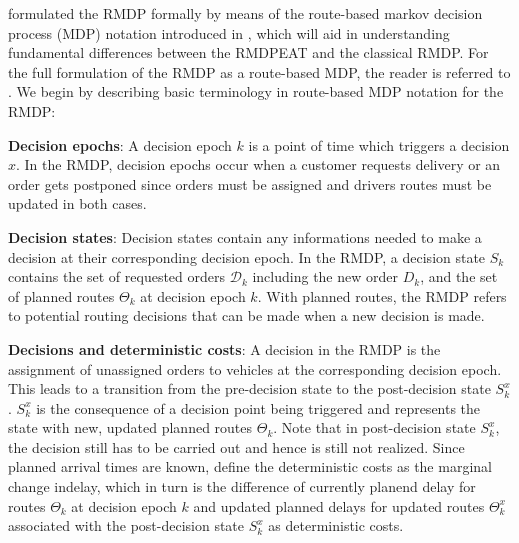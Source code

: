\cite{UlmerRMDP} formulated the RMDP formally by means of the route-based markov decision process (MDP) notation introduced in \cite{ulmer2017route}, which will aid in understanding fundamental differences between the RMDPEAT and the classical RMDP. For the full formulation of the RMDP as a route-based MDP, the reader is referred to \cite{UlmerBarrett2017_TWAP}. We begin by describing basic terminology in route-based MDP notation for the RMDP:
\begin{description}[font=$\bullet$\scshape\bfseries]
	\item \textbf{Decision epochs}: A decision epoch $ k $ is a point of time which triggers a decision $ x $. In the RMDP, decision epochs occur when a customer requests delivery or an order gets postponed since orders must be assigned and drivers routes must be updated in both cases.
	
	\item \textbf{Decision states}: Decision states contain any informations needed to make a decision at their corresponding decision epoch. In the RMDP, a decision state $ S_k $ contains the set of requested orders $ \mathcal{D}_k $ including the new order $ D_k $, and the set of planned routes $ \Theta_k $ at decision epoch $ k $. With planned routes, the RMDP refers to potential routing decisions that can be made when a new decision is made. 
	
	\item \textbf{Decisions and deterministic costs}: A decision in the RMDP is the assignment of unassigned orders to vehicles at the corresponding decision epoch. This leads to a transition from the pre-decision state to the post-decision state $ S^{x}_k $. $ S^{x}_k $ is the consequence of a decision point being triggered and represents the state with new, updated planned routes $ \Theta_k $. Note that in post-decision state $ S^{x}_k $, the decision still has to be carried out and hence is still not realized. Since planned arrival times are known, \cite{UlmerBarrett2017_TWAP} define the deterministic costs as the marginal change indelay, which in turn is the difference of currently planend delay for routes $ \Theta_k $ at decision epoch $ k $ and updated planned delays for updated routes $ \Theta^{x}_k $ associated with the post-decision state $ S^{x}_k $ as deterministic costs.
	

\end{description}
